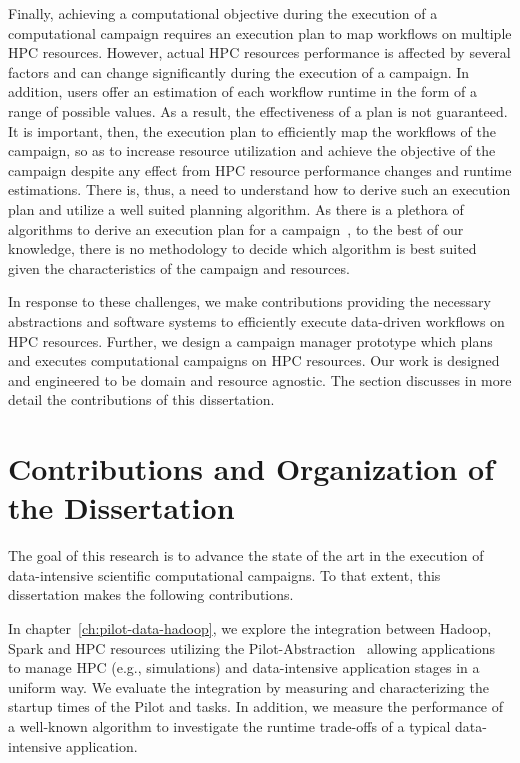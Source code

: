Finally, achieving a computational objective during the execution of a 
computational campaign requires an execution plan to map workflows on multiple 
HPC resources. However, actual HPC resources performance is affected by several 
factors and can change significantly during the execution of a campaign. In 
addition, users offer an estimation of each workflow runtime in the form of a 
range of possible values. As a result, the effectiveness of a plan is not 
guaranteed. It is important, then, the execution plan to efficiently map the 
workflows of the campaign, so as to increase resource utilization and achieve 
the objective of the campaign despite any effect from HPC resource performance 
changes and runtime estimations. There is, thus, a need to understand how to 
derive such an execution plan and utilize a well suited planning algorithm. As 
there is a plethora of algorithms to derive an execution plan for a 
campaign~\cite{lu2019review}, to the best of our knowledge, there is no 
methodology to decide which algorithm is best suited given the characteristics 
of the campaign and resources.

In response to these challenges, we make contributions providing the necessary
abstractions and software systems to efficiently execute data-driven workflows
on HPC resources. Further, we design a campaign manager prototype which plans
and executes computational campaigns on HPC resources. Our work is designed and
engineered to be domain and resource agnostic. The section discusses in more
detail the contributions of this dissertation.

\section{Contributions and Organization of the Dissertation}

The goal of this research is to advance the state of the art in the execution
of data-intensive scientific computational campaigns. To that extent, this
dissertation makes the following contributions.

In chapter~\ref{ch:pilot-data-hadoop}, we explore the integration between 
Hadoop, Spark and HPC resources utilizing the 
Pilot-Abstraction~\cite{luckow2012pstar} allowing applications to manage HPC 
(e.g., simulations) and data-intensive application stages in a uniform way. We 
evaluate the integration by measuring and characterizing the startup times of 
the Pilot and tasks. In addition, we measure the performance of a well-known  
algorithm to investigate the runtime trade-offs of a typical data-intensive 
application.

